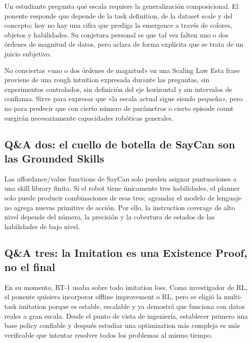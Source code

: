 Un estudiante pregunta qué escala requiere la generalización composicional. El ponente responde que depende de la task definition, de la dataset scale y del concepto; hoy no hay una cifra que prediga la emergence a través de colores, objetos y habilidades. Su conjetura personal es que tal vez falten uno o dos órdenes de magnitud de datos, pero aclara de forma explícita que se trata de un juicio subjetivo.

\begin{warningbox}{No conviertas «uno o dos órdenes de magnitud» en una Scaling Law}
Esta frase proviene de una rough intuition expresada durante las preguntas, sin experimentos controlados, sin definición del eje horizontal y sin intervalos de confianza. Sirve para expresar que «la escala actual sigue siendo pequeña», pero no para predecir que con cierto número de parámetros o cierto episode count surgirán necesariamente capacidades robóticas generales.
\end{warningbox}

\subsection{Q\&A dos: el cuello de botella de SayCan son las Grounded Skills}

Las affordance/value functions de SayCan solo pueden asignar puntuaciones a una skill library finita. Si el robot tiene únicamente tres habilidades, el planner solo puede producir combinaciones de esas tres; agrandar el modelo de lenguaje no agrega nuevas primitive de acción. Por ello, la instruction coverage de alto nivel depende del número, la precisión y la cobertura de estados de las habilidades de bajo nivel.


\subsection{Q\&A tres: la Imitation es una Existence Proof, no el final}

En su momento, RT-1 usaba sobre todo imitation loss. Como investigador de RL, el ponente quisiera incorporar offline improvement o RL, pero se eligió la multi-task imitation porque es estable, escalable y ya demostró que funciona con datos reales a gran escala. Desde el punto de vista de ingeniería, establecer primero una base policy confiable y después estudiar una optimization más compleja es más verificable que intentar resolver todos los problemas al mismo tiempo.

